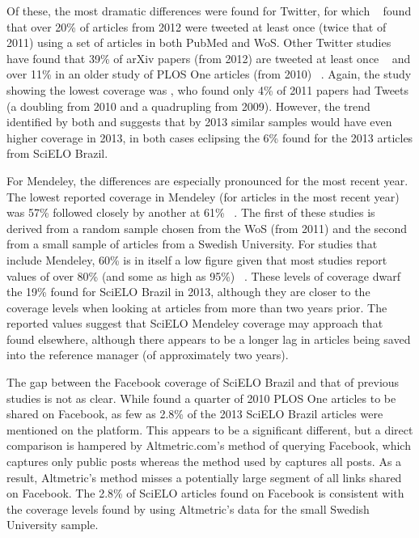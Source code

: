Of these, the most dramatic differences were found for Twitter, for which ~\citep{Haustein2014b} found that over 20\% of articles from 2012 were tweeted at least once (twice that of 2011) using a set of articles in both PubMed and WoS. Other Twitter studies have found that 39\% of arXiv papers (from 2012) are tweeted at least once ~\citep{Haustein2014a} and over 11\% in an older study of PLOS One articles (from 2010) ~\citep{Priem2012}. Again, the study showing the lowest coverage was  \citet{Zahedi2014}, who found only 4\% of 2011 papers had Tweets (a doubling from 2010 and a quadrupling from 2009). However, the trend identified by both  \citet{Haustein2014b} and  \citet{Zahedi2014} suggests that by 2013 similar samples would have even higher coverage in 2013, in both cases eclipsing the 6\% found for the 2013 articles from SciELO Brazil.

For Mendeley, the differences are especially pronounced for the most recent year. The lowest reported coverage in Mendeley (for articles in the most recent year) was 57\%  \citet{Zahedi2014} followed closely by another at 61\% ~\citep{Hammarfelt2014}. The first of these studies is derived from a random sample chosen from the WoS (from 2011) and the second from a small sample of articles from a Swedish University. For studies that include Mendeley, 60\% is in itself a low figure given that most studies report values of over 80\% (and some as high as 95\%) ~\citep{Li2012a,Priem2012,Bar-ilan2014,Zahedi2014a}. These levels of coverage dwarf the 19\% found for SciELO Brazil in 2013, although they are closer to the coverage levels when looking at articles from more than two years prior. The reported values suggest that SciELO Mendeley coverage may approach that found elsewhere, although there appears to be a longer lag in articles being saved into the reference manager (of approximately two years).

The gap between the Facebook coverage of SciELO Brazil and that of previous studies is not as clear. While  \citet{Priem2012} found a quarter of 2010 PLOS One articles to be shared on Facebook, as few as 2.8\% of the 2013 SciELO Brazil articles were mentioned on the platform. This appears to be a significant different, but a direct comparison is hampered by Altmetric.com's method of querying Facebook, which captures only public posts whereas the method used by  \citet{Priem2012} captures all posts. As a result, Altmetric's method misses a potentially large segment of all links shared on Facebook. The 2.8\% of SciELO articles found on Facebook is consistent with the coverage levels found by  \citet{Hammarfelt2014} using Altmetric's data for the small Swedish University sample.

